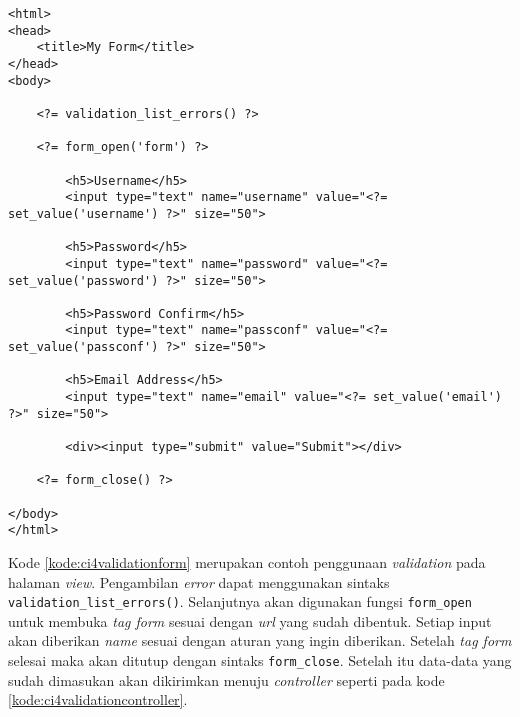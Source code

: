 \begin{lstlisting}[caption=Contoh kode untuk melakukan pengumpulan data. ,label=kode:ci4validationform]
<html>
<head>
    <title>My Form</title>
</head>
<body>

    <?= validation_list_errors() ?>

    <?= form_open('form') ?>

        <h5>Username</h5>
        <input type="text" name="username" value="<?= set_value('username') ?>" size="50">

        <h5>Password</h5>
        <input type="text" name="password" value="<?= set_value('password') ?>" size="50">

        <h5>Password Confirm</h5>
        <input type="text" name="passconf" value="<?= set_value('passconf') ?>" size="50">

        <h5>Email Address</h5>
        <input type="text" name="email" value="<?= set_value('email') ?>" size="50">

        <div><input type="submit" value="Submit"></div>

    <?= form_close() ?>

</body>
</html>
\end{lstlisting}

Kode \ref{kode:ci4validationform} merupakan contoh penggunaan \textit{validation} pada halaman \textit{view}. Pengambilan \textit{error} dapat menggunakan sintaks \texttt{validation\_list\_errors()}. Selanjutnya akan digunakan fungsi \texttt{form\_open} untuk membuka \textit{tag form} sesuai dengan \textit{url} yang sudah dibentuk. Setiap input akan diberikan \textit{name} sesuai dengan aturan yang ingin diberikan. Setelah \textit{tag form} selesai maka akan ditutup dengan sintaks \texttt{form\_close}. Setelah itu data-data yang sudah dimasukan akan dikirimkan menuju \textit{controller} seperti pada kode \ref{kode:ci4validationcontroller}.

